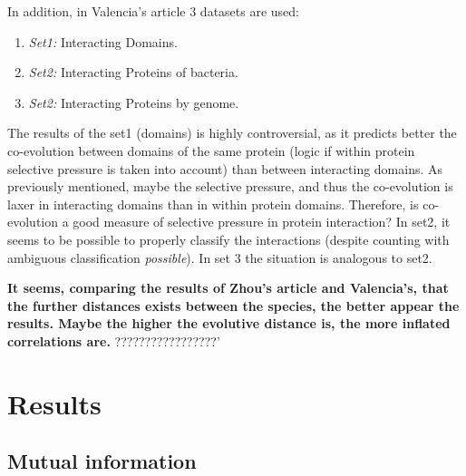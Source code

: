 \documentclass[11pt]{article}
\begin{document}
In addition, in Valencia's article\cite{Pazos2001} 3 datasets are used:
\begin{enumerate}
\setlength{\itemsep}{1pt}
	\item \textit{Set1:} Interacting Domains.
	\item \textit{Set2:} Interacting Proteins of bacteria.
	\item \textit{Set2:} Interacting Proteins by genome.
\end{enumerate}
The results of the set1 (domains) is highly controversial, as it predicts better the co-evolution between domains of the same protein (logic if within protein selective pressure is taken into account) than between interacting domains. As previously mentioned, maybe the selective pressure, and thus the co-evolution is laxer in interacting domains than in within protein domains. Therefore, is co-evolution a good measure of selective pressure in protein interaction?
In set2, it seems to be possible to properly classify the interactions (despite counting with ambiguous classification \textit{possible}). In set 3 the situation is analogous to set2.

\textbf{\textbf{It seems, comparing the results of Zhou's article and Valencia's, that the further distances exists between the species, the better appear the results. Maybe the higher the evolutive distance is, the more inflated correlations are.}} ?????????????????'


\section{Results}
\subsection{Mutual information}


	
\end{document}
